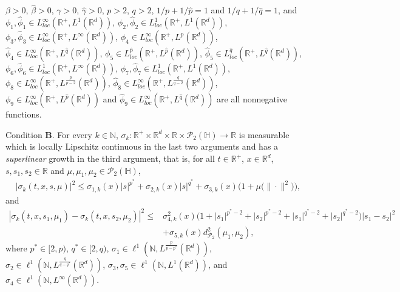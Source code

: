 \documentclass[11pt]{article}
\renewcommand{\leq}{\leqslant}
\numberwithin{equation}{section}
\begin{document}
$\beta>0$, $\widehat{\beta}>0$, $\gamma>0$, $\widehat{\gamma}>0$,
 $p>2$,
$q>2$, $1/p+1/\widehat{p}=1$ and $1/q+1/\widehat{q}=1$, and
 $\phi_1,\widehat{\phi}_1
 \in  L_{loc}^\infty(\mathbb{R}^+,
 L^1(\mathbb{R}^d))$, $\phi_2,\widehat{\phi}_2\in L_{loc}^1(\mathbb{R}^+,
   L^1(\mathbb{R}^d))$, $
 \phi_3,\widehat{\phi}_3\in  L_{loc}^\infty(\mathbb{R}^+,
 L^\infty(\mathbb{R}^d))$,
   $\phi_4\in L_{loc}^{\infty}(\mathbb{R}^+,L^{\widehat{p}}
(\mathbb{R}^d))$, $\widehat{\phi}_4\in L_{loc}^{\infty}(\mathbb{R}^+,
L^{\widehat{q}}
(\mathbb{R}^d))$, $\phi_5\in L_{loc}^{\widehat{p}}(\mathbb{R}^+,
 L^{\widehat{p}}(\mathbb{R}^d))$,
 $\widehat{\phi}_5\in L_{loc}^{\widehat{q}}(\mathbb{R}^+,
 L^{\widehat{q}}(\mathbb{R}^d))$, $\phi_6,\widehat{\phi}_6\in L_{loc}^1(\mathbb{R}^+,
 L^{\infty}(\mathbb{R}^d))$, $\phi_7,
 \widehat{\phi}_7\in L_{loc}^{1}(\mathbb{R}^+,
 L^{1}(\mathbb{R}^d))$, $\phi_8\in L_{loc}^{\infty}(\mathbb{R}^+, L^{\frac{p}{p-2}}(\mathbb{R}^d))$,
 $\widehat{\phi}_8\in L_{loc}^{\infty}(\mathbb{R}^+, L^{\frac{q}{q-2}}(\mathbb{R}^d))$,
 $\phi_9\in L_{loc}^{\infty}(\mathbb{R}^+, L^{\widehat{p}}(\mathbb{R}^d))$ and
 $\widehat{\phi}_9\in L_{loc}^{\infty}(\mathbb{R}^+, L^{\widehat{q}}(\mathbb{R}^d))$ are all nonnegative functions.

Condition \textbf{B}. For every $k\in \mathbb{N}$,
$\sigma_k:\mathbb{R}^+\times \mathbb{R}^d\times\mathbb{R}\times
\mathcal{P}_2(\mathbb{H})\rightarrow \mathbb{R}$ is
measurable which is
   locally Lipschitz continuous
 in the last two arguments and
  has a \emph{superlinear} growth in the third argument, that is, for
  all $t\in\mathbb{R}^+$,
$x\in\mathbb{R}^d$, $s,s_1,s_2\in\mathbb{R}$ and $\mu,\mu_1,\mu_2
\in\mathcal{P}_2(\mathbb{H})$,
\begin{align}\label{h2}
|\sigma_k(t,x,s,\mu)|^2\leq \sigma_{1,k}(x)
|s|^{p^*}+\sigma_{2,k}(x)
|s|^{q^*}
+\sigma_{3,k}(x)\big(1+\mu\big(\|\cdot\|^2)\big),
\end{align}
and
\begin{align}\label{h2a}
|\sigma_k(t,x,s_1,\mu_1)-\sigma_k(t,x,s_2,\mu_2)
|^2 \leq
& \sigma^2_{4,k}(x)\big( 1+ |s_1|^{p^*-2}+ |s_2|^{p^*-2} +|s_1|^{q^*-2}
   +|s_2|^{q^*-2} \big)|s_1-s_2|^2 \nonumber\\
& +\sigma_{5,k}(x)
d_{\mathcal{P}_2}^2(\mu_1,\mu_2),
\end{align}
where  $p^*\in[2,p)$, $q^*\in[2,q)$,  $\sigma_1\in
 \ell^{1}
 (\mathbb{N},L^{\frac{p}{p-p^*}}(\mathbb{R}^d))$,
$\sigma_2
 \in
 \ell^{1}
 (\mathbb{N},L^{\frac{q}{q-q^*}}(\mathbb{R}^d))$,
 $\sigma_3,\sigma_5
 \in
 \ell^{1}
 (\mathbb{N},L^1(\mathbb{R}^d))$, and $\sigma_4\in
 \ell^{1}
 (\mathbb{N},L^{\infty}
 (\mathbb{R}^d))   $.
\end{document}
